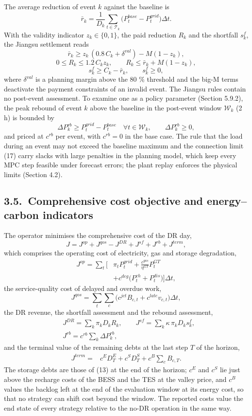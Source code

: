 \documentclass[a4paper,twocolumn,fleqn,10pt]{article}
\begin{document}
The average reduction of event \(k\) against the baseline is \[\bar r_k=\frac{1}{D_k}\sum_{t\in\mathcal T_k}\big(P^{base}_t-P^{grid}_t\big)\Delta t . \tag{21}\] With the validity indicator \(z_k\in\{0,1\}\), the paid reduction \(R_k\) and the shortfall \(s^{f}_k\), the Jiangsu settlement reads \[\bar r_k\ge z_k\,(0.8\,C_k+\delta^{val})-M(1-z_k), \tag{22}\] \[0\le R_k\le1.2\,C_kz_k,\qquad R_k\le\bar r_k+M(1-z_k), \tag{23}\] \[s^{f}_k\ge C_k-\bar r_k,\qquad s^{f}_k\ge0, \tag{24}\] where \(\delta^{val}\) is a planning margin above the 80 \% threshold and the big-M terms deactivate the payment constraints of an invalid event. The Jiangsu rules contain no post-event assessment. To examine one as a policy parameter (Section 5.9.2), the peak rebound of event \(k\) above the baseline in the post-event window \(\mathcal W_k\) (2 h) is bounded by \[\Delta P^{rb}_k\ge P^{grid}_t-P^{base}_t\quad\forall t\in\mathcal W_k,\qquad \Delta P^{rb}_k\ge0, \tag{25}\] and priced at \(c^{rb}\) per event, with \(c^{rb}=0\) in the base case. The rule that the load during an event may not exceed the baseline maximum and the connection limit (17) carry slacks with large penalties in the planning model, which keep every MPC step feasible under forecast errors; the plant replay enforces the physical limits (Section 4.2).

\subsection*{3.5.~Comprehensive cost objective and energy--carbon indicators}

The operator minimises the comprehensive cost of the DR day, \[J=J^{op}+J^{qos}-J^{DR}+J^{sf}+J^{rb}+J^{term}, \tag{26}\] which comprises the operating cost of electricity, gas and storage degradation, \[\begin{aligned}J^{op}=\sum_t\Big[&\pi_tP^{grid}_t+\frac{c^{gas}}{\eta^{GT}}P^{GT}_t\\&+c^{deg}\big(P^{ch}_t+P^{dis}_t\big)\Big]\Delta t,\end{aligned} \tag{27}\] the service-quality cost of delayed and overdue work, \[J^{qos}=\sum_t\sum_c\big(c^{jct}B_{c,t}+c^{late}v_{c,t}\big)\Delta t, \tag{28}\] the DR revenue, the shortfall assessment and the rebound assessment, \[\begin{aligned}&J^{DR}=\textstyle\sum_k\pi_kD_kR_k,\qquad J^{sf}=\textstyle\sum_k\kappa\,\pi_kD_ks^{f}_k,\\&J^{rb}=c^{rb}\textstyle\sum_k\Delta P^{rb}_k,\end{aligned} \tag{29}\] and the terminal value of the remaining debts at the last step \(T\) of the horizon, \[\begin{aligned}J^{term}={}&c^{E}D^E_T+c^{S}D^S_T+c^{B}\textstyle\sum_cB_{c,T}.\end{aligned} \tag{30}\] The storage debts are those of (13) at the end of the horizon; \(c^{E}\) and \(c^{S}\) lie just above the recharge costs of the BESS and the TES at the valley price, and \(c^{B}\) values the backlog left at the end of the evaluation window at its energy cost, so that no strategy can shift cost beyond the window. The reported costs value the end state of every strategy relative to the no-DR operation in the same way.
\end{document}
